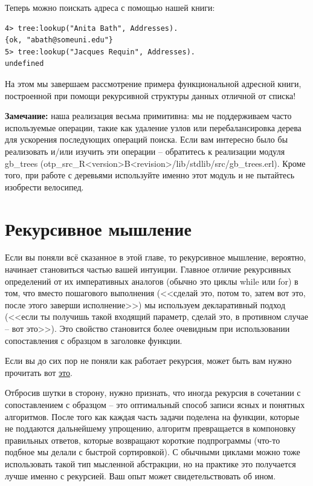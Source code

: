 \documentclass[a4paper,12pt]{report}
\newcommand{\ops}{\colorbox{lgreen}}
\begin{document}
Теперь можно поискать адреса с помощью нашей книги:
\begin{lstlisting}[style=erlang]
4> tree:lookup("Anita Bath", Addresses).
{ok, "abath@someuni.edu"}
5> tree:lookup("Jacques Requin", Addresses).
undefined
\end{lstlisting}

На этом мы завершаем рассмотрение примера функциональной адресной книги, построенной при помощи рекурсивной структуры данных отличной от списка!\\
\colorbox{lgray}
{
    \begin{minipage}{\linewidth}
\textbf{Замечание:} наша реализация весьма примитивна: мы не поддерживаем часто используемые операции, такие как удаление узлов или перебалансировка дерева для ускорения последующих операций поиска. Если вам интересно было бы реализовать и/или изучить эти операции \--- обратитесь к реализации модуля \ops{gb\_trees} (\ops{otp\_src\_R<version>B<revision>/lib/stdlib/src/gb\_trees.erl}). Кроме того, при работе с деревьями используйте именно этот модуль и не пытайтесь изобрести велосипед.
    \end{minipage}
}
\section{Рекурсивное мышление}
Если вы поняли всё сказанное в этой главе, то рекурсивное мышление, вероятно, начинает становиться частью вашей интуиции. Главное отличие рекурсивных определений от их императивных аналогов (обычно это циклы while или for) в том, что вместо пошагового выполнения (<<сделай это, потом то, затем вот это, после этого заверши исполнение>>) мы используем декларативный подход (<<если ты получишь такой входящий параметр, сделай это, в противном случае \--- вот это>>). Это свойство становится более очевидным при использовании сопоставления с образцом в заголовке функции.

Если вы до сих пор не поняли как работает рекурсия, может быть вам нужно прочитать вот \href{http://learnyousomeerlang.com/recursion}{это}.

Отбросив шутки в сторону, нужно признать, что иногда рекурсия в сочетании с сопоставлением с образцом \--- это оптимальный способ записи ясных и понятных алгоритмов. После того как каждая часть задачи поделена на функции, которые не поддаются дальнейшему упрощению, алгоритм превращается в компоновку правильных ответов, которые возвращают короткие подпрограммы (что\--то подбное мы делали с быстрой сортировкой). С обычными циклами можно тоже использовать такой тип мысленной абстракции, но на практике это получается лучше именно с рекурсией. Ваш опыт может свидетельствовать об ином.
\end{document}

